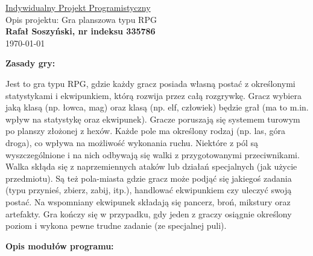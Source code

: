 \documentclass[a4paper, 11pt]{article}
\newcommand{\przedmiot}{Indywidualny Projekt Programistyczny}
\newcommand{\podpisAutora}{Rafał Soszyński, nr indeksu 335786}
\newcommand{\data}{\today}%
\newcommand*{\naglowek}{
\begin{center}
{\huge \underline{\przedmiot}}
\\\vspace{0.50cm}
Opis projektu: Gra planszowa typu RPG
\\\vspace{0.1cm}
{\large \textbf{\podpisAutora}}
\\\vspace{0.15cm}
\small{\data}
\\\vspace{1cm}
\end{center}
}
\begin{document}
\naglowek

\noindent\textbf{Zasady gry:}

Jest to gra typu RPG, gdzie każdy gracz posiada własną postać z określonymi statystykami i ekwipunkiem, którą rozwija przez całą rozgrywkę.
Gracz wybiera jaką klasą (np. łowca, mag) oraz klasą (np. elf, człowiek) będzie grał (ma to m.in. wpływ na statystykę oraz ekwipunek).
Gracze poruszają się systemem turowym po planszy złożonej z hexów.
Każde pole ma określony rodzaj (np. las, góra droga), co wpływa na możliwość wykonania ruchu.
Niektóre z pól są wyszczególnione i na nich odbywają się walki z przygotowanymi przeciwnikami.
Walka skłąda się z naprzemiennych ataków lub działań specjalnych (jak użycie przedmiotu).
Są też pola-miasta gdzie gracz może podjąć się jakiegoś zadania (typu przynieś, zbierz, zabij, itp.), handlować ekwipunkiem czy uleczyć swoją postać.
Na wspomniany ekwipunek składają się pancerz, broń, mikstury oraz artefakty.
Gra kończy się w przypadku, gdy jeden z graczy osiągnie określony poziom i wykona pewne trudne zadanie (ze specjalnej puli).

\vspace{0,5cm}

\noindent\textbf{Opis modułów programu:}
\end{document}
